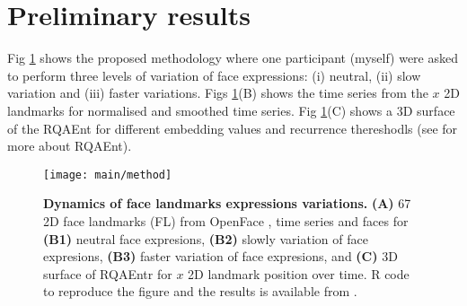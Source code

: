 \documentclass[12pt]{article}
\begin{document}
\section{Preliminary results}
Fig \ref{fig:method} shows the proposed methodology 
where one participant (myself) were asked to perform three levels of variation of face expressions:
(i) neutral, (ii) slow variation and (iii) faster variations.
Figs \ref{fig:method}(B) shows the time series from the $x$ 2D landmarks
for normalised and smoothed time series. 
Fig \ref{fig:method}(C) shows a 3D surface of the RQAEnt for different 
embedding values and recurrence thereshodls 
(see \cite{2018arXiv181009249X} for more about RQAEnt).


\begin{figure}
\centering
\texttt{[image: main/method]}
    \caption{
	{\bf Dynamics of face landmarks expressions variations.}
	{\bf(A)} 67 2D face landmarks (FL) from OpenFace \cite{baltrusaitis2018},
	time series and faces for 
	{\bf(B1)} neutral face expresions,
	{\bf(B2)} slowly variation of face expresions,
	{\bf(B3)} faster variation of face expresions, and  
	{\bf(C)} 3D surface of RQAEntr for $x$ 2D landmark position over time.
	R code to reproduce the figure and the results 
	is available from \cite{xochicale2018repo}.
        }
\label{fig:method}
\end{figure}




\end{document}
